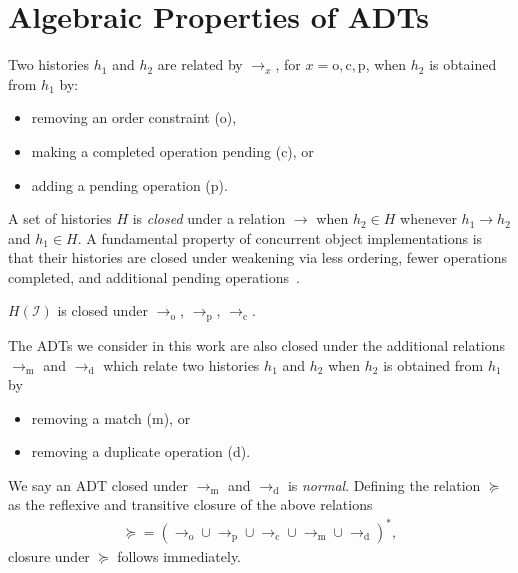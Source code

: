 \section{Algebraic Properties of ADTs}
\label{sec:algebra}

Two histories $h_1$ and $h_2$ are related by $\to_x$, for $x = \mathrm{o},
\mathrm{c}, \mathrm{p}$, when $h_2$ is obtained from $h_1$ by:
\begin{itemize}

  \item removing an order constraint (o),

  \item making a completed operation pending (c), or

  \item adding a pending operation (p).

\end{itemize}
A set of histories $H$ is \emph{closed} under a relation $\to$ when $h_2 \in H$
whenever $h_1 \to h_2$ and $h_1 \in H$. A fundamental property of concurrent
object implementations is that their histories are closed under weakening via
less ordering, fewer operations completed, and additional pending
operations~\cite{conf/popl/BouajjaniEEH15}.

\begin{lemma}

  $H(\mathcal{I})$ is closed under $\to_\mathrm{o}$, $\to_\mathrm{p}$, 
  $\to_\mathrm{c}$.

\end{lemma}

The ADTs we consider in this work are also closed under the additional
relations $\to_\mathrm{m}$ and $\to_\mathrm{d}$ which relate two histories
$h_1$ and $h_2$ when $h_2$ is obtained from $h_1$ by
\begin{itemize}

  \item removing a match (m), or

  \item removing a duplicate operation (d).

\end{itemize}
We say an ADT closed under $\to_\mathrm{m}$ and $\to_\mathrm{d}$ is
\emph{normal}. Defining the relation $\succeq$ as the reflexive and transitive
closure of the above relations
\begin{align*}
  \succeq = (\to_\mathrm{o} \cup \to_\mathrm{p} \cup \to_\mathrm{c} \cup 
  \to_\mathrm{m} \cup \to_\mathrm{d})^\ast,
\end{align*}
closure under $\succeq$ follows immediately.

